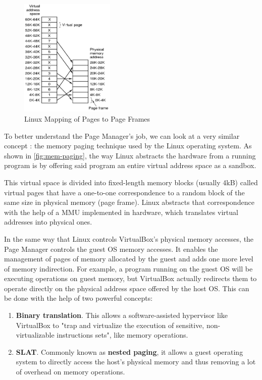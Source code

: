 \begin{figure}
	\centering \scriptsize
	\vspace{-12pt}
	\includegraphics[width=0.40\textwidth,keepaspectratio]{art/mem-paging.png}
	\caption{Linux Mapping of Pages to Page Frames \cite{misc:mem-paging}}
	\label{fig:mem-paging}
	\vspace{-12pt}
\end{figure}
To better understand the Page Manager's job, we can look at a very similar concept : the memory paging technique used by the Linux operating system. As shown in \autoref{fig:mem-paging}, the way Linux abstracts the hardware from a running program is by offering said program an entire virtual address space as a sandbox. 

This virtual space is divided into fixed-length memory blocks (usually 4kB) called virtual pages that have a one-to-one correspondence to a random block of the same size in physical memory (page frame). Linux abstracts that correspondence with the help of a \gls{MMU} implemented in hardware, which translates virtual addresses into physical ones.

In the same way that Linux controls VirtualBox's physical memory accesses, the Page Manager controls the guest OS memory accesses. It enables the management of pages of memory allocated by the guest and adds one more level of memory indirection. For example, a program running on the guest OS will be executing operations on guest memory, but VirtualBox actually redirects them to operate directly on the physical address space offered by the host OS. This can be done with the help of two powerful concepts:
\begin{enumerate}
	\item \textbf{Binary translation}. This allows a software-assisted hypervisor like VirtualBox to "trap and virtualize the execution of sensitive, non-virtualizable instructions sets"\cite{online:virtualization}, like memory operations.
	\item \textbf{\gls{SLAT}}. Commonly known as \textbf{nested paging}, it allows a guest operating system to directly access the host's physical memory and thus removing a lot of overhead on memory operations.
\end{enumerate} 

